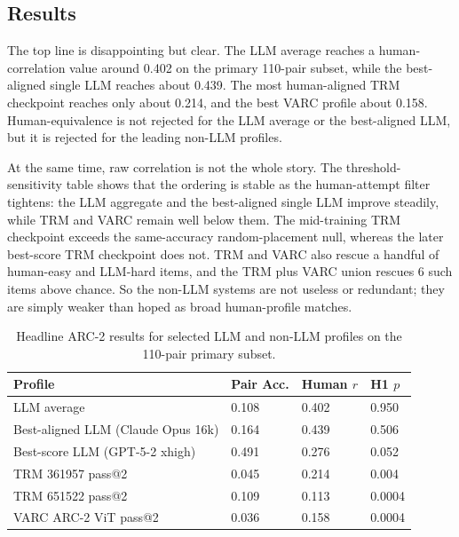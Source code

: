 \subsection{Results}

The top line is disappointing but clear. The LLM average reaches a human-correlation value around 0.402 on the primary 110-pair subset, while the best-aligned single LLM reaches about 0.439. The most human-aligned TRM checkpoint reaches only about 0.214, and the best VARC profile about 0.158. Human-equivalence is not rejected for the LLM average or the best-aligned LLM, but it is rejected for the leading non-LLM profiles.

At the same time, raw correlation is not the whole story. The threshold-sensitivity table shows that the ordering is stable as the human-attempt filter tightens: the LLM aggregate and the best-aligned single LLM improve steadily, while TRM and VARC remain well below them. The mid-training TRM checkpoint exceeds the same-accuracy random-placement null, whereas the later best-score TRM checkpoint does not. TRM and VARC also rescue a handful of human-easy and LLM-hard items, and the TRM plus VARC union rescues 6 such items above chance. So the non-LLM systems are not useless or redundant; they are simply weaker than hoped as broad human-profile matches.

\begin{table}[H]
\centering
\small
\caption{Headline ARC-2 results for selected LLM and non-LLM profiles on the 110-pair primary subset.}
\begin{tabular}{p{2.45in}p{0.8in}p{0.9in}p{0.8in}}
\toprule
\textbf{Profile} & \textbf{Pair Acc.} & \textbf{Human $r$} & \textbf{H1 $p$} \\
\midrule
LLM average & 0.108 & 0.402 & 0.950 \\
Best-aligned LLM (Claude Opus 16k) & 0.164 & 0.439 & 0.506 \\
Best-score LLM (GPT-5-2 xhigh) & 0.491 & 0.276 & 0.052 \\
TRM 361957 pass@2 & 0.045 & 0.214 & 0.004 \\
TRM 651522 pass@2 & 0.109 & 0.113 & 0.0004 \\
VARC ARC-2 ViT pass@2 & 0.036 & 0.158 & 0.0004 \\
\bottomrule
\end{tabular}
\end{table}

